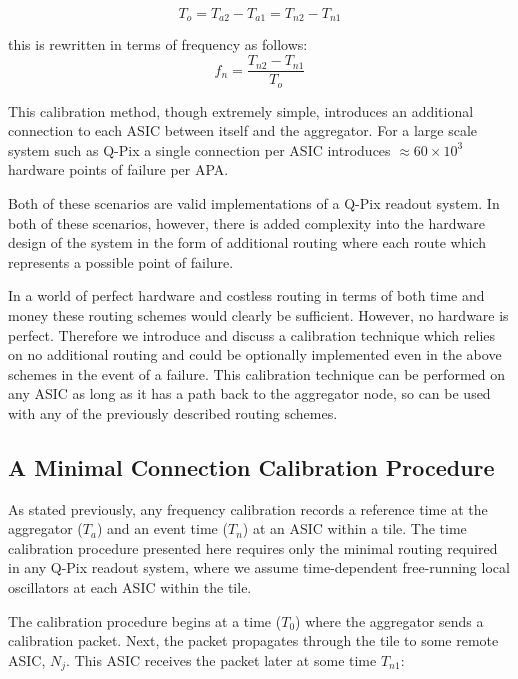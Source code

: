 \begin{equation}
  T_{o} = T_{a2} - T_{a1} = T_{n2} - T_{n1}
\end{equation}

this is rewritten in terms of frequency as follows:
\begin{equation}
  f_{n} = \frac{T_{n2} - T_{n1}}{T_{o}}
\end{equation}

This calibration method, though extremely simple, introduces an additional connection to each ASIC between itself and the aggregator.
For a large scale system such as Q-Pix a single connection per ASIC introduces $\approx 60\times 10^{3}$ hardware points of failure per APA.

Both of these scenarios are valid implementations of a Q-Pix readout system.
In both of these scenarios, however, there is added complexity into the hardware design of the system in the form of additional routing where each route which represents a possible point of failure.

In a world of perfect hardware and costless routing in terms of both time and money these routing schemes would clearly be sufficient.
However, no hardware is perfect.
Therefore we introduce and discuss a calibration technique which relies on no additional routing and could be optionally implemented even in the above schemes in the event of a failure.
This calibration technique can be performed on any ASIC as long as it has a path back to the aggregator node, so can be used with any of the previously described routing schemes.

\subsection{A Minimal Connection Calibration Procedure}\label{sec:min_calib}
As stated previously, any frequency calibration records a reference time at the aggregator ($T_{a}$) and an event time ($T_{n}$) at an ASIC within a tile.
The time calibration procedure presented here requires only the minimal routing required in any Q-Pix readout system, where we assume time-dependent free-running local oscillators at each ASIC within the tile.

The calibration procedure begins at a time ($T_{0}$) where the aggregator sends a calibration packet.
Next, the packet propagates through the tile to some remote ASIC, $N_{j}$.
This ASIC receives the packet later at some time $T_{n1}$:

